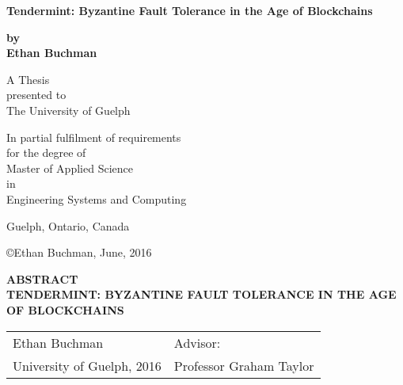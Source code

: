 
\begin{titlepage}
    \begin{center}
        \vspace*{1cm}
        
        \textbf{\large{Tendermint: Byzantine Fault Tolerance in the Age of Blockchains}}\\
        
        \vspace{1 cm}

        \textbf{by} \\
        \vspace{1 cm}
        \textbf{Ethan Buchman}
        
        \vfill
        
        A Thesis \\
	presented to \\
	The University of Guelph 

        \vspace{0.8cm}

	In partial fulfilment of requirements \\
	for the degree of \\
	Master of Applied Science \\
       	in \\
	Engineering Systems and Computing

	\vspace{0.8cm}
	Guelph, Ontario, Canada

	\vspace{0.8cm}
	\copyright Ethan Buchman, June, 2016
    \end{center}
\end{titlepage}

\clearpage

\thispagestyle{plain}
\begin{center}
    \textbf{ABSTRACT} \\ 
    \vspace{0.6cm}
    \textbf{TENDERMINT: BYZANTINE FAULT TOLERANCE IN THE AGE OF BLOCKCHAINS}
\end{center}
    
\vspace{0.6cm}
\begin{tabular}{ p{} p{} }
Ethan Buchman & Advisor:\\ 
University of Guelph, 2016 & Professor Graham Taylor
\end{tabular}


